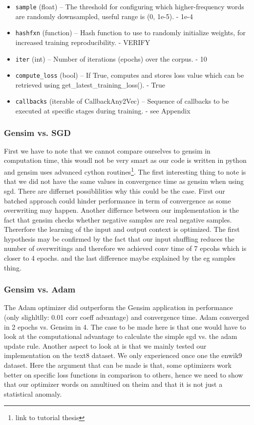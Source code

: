\begin{itemize}
 \item   \texttt{sample} (float) – The threshold for configuring which higher-frequency words are randomly downsampled, useful range is (0, 1e-5). - 1e-4
   \item \texttt{hashfxn} (function) – Hash function to use to randomly initialize weights, for increased training reproducibility. - VERIFY 
  \item  \texttt{iter} (int) – Number of iterations (epochs) over the corpus. - 10 
 \
  \item  \texttt{compute\_loss} (bool) – If True, computes and stores loss value which can be retrieved using get\_latest\_training\_loss(). - True
 \item   \texttt{callbacks} (iterable of CallbackAny2Vec) – Sequence of callbacks to be executed at specific stages during training. - see Appendix
\end{itemize}

\subsubsection{Gensim vs. SGD}
First we have to note that we cannot compare ourselves to gensim in computation time, this woudl not be very smart as our code is written in python and gensim uses advanced cython routines\footnote{link to tutorial thesis}. 
The first interesting thing to note is that we did not have the same values in convergence time as gensim when using sgd. There are differnet possiblilities why this could be the case. First our batched approach could hinder performance in term of convergence as some overwriting may happen. Another differnce between our implementation is the fact that gensim checks whether negative samples are real negative samples. Thererfore the learning of the input and output context is optimized. 
The first hypothesis may be confirmed by the fact that our input shuffling reduces the number of overwritings and therefore we achieved conv time of 7 epcohs which is closer to 4 epochs. and the last difference maybe explained by the eg samples thing. 

\subsubsection{Gensim vs. Adam}
The Adam optimizer did outperform the Gensim application in performance (only slighltlly: 0.01 corr coeff advantage) and convergence time. Adam converged in 2 epochs vs. Gensim in 4. The case to be made here is that one would have to look at the computational advantage to calculate the simple sgd vs.  the adam update rule. Another aspect to look at is that we mainly tested our implementation on the text8 dataset. We only experienced once one the enwik9 dataset. Here the argument that can be made is that, some optimizers work better on specific loss functions in comparison to others, hence we need to show that our optimizer words on amultiued on theim and that it is not just a statistical anomaly.
